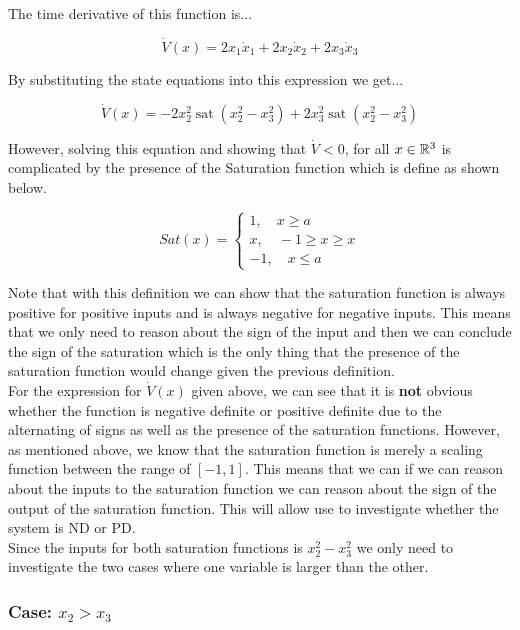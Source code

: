 \noindent The time derivative of this function is...

$$
\dot{V}(x) = 2x_1\dot{x}_1 + 2x_2\dot{x}_2 + 2x_3\dot{x}_3
$$


\noindent By substituting the state equations into this expression we get...

$$
\dot{V}(x)=-2 x_{2}^{2} \operatorname{sat}\left(x_{2}^{2}-x_{3}^{2}\right)+2 x_{3}^{2} \operatorname{sat}\left(x_{2}^{2}-x_{3}^{2}\right)
$$

However, solving this equation and showing that $\dot{V} < 0$, for all $x \in \mathbb{R}^3$ is complicated by the presence of the Saturation function which is define as shown below.

$$
Sat(x) = \begin{cases}
1, \quad x \geq a \\
x, \quad -1\geq x \geq x\\
-1, \quad x\leq a
\end{cases}
$$


\noindent Note that with this definition we can show that the saturation function is always positive for positive inputs and is always negative for negative inputs. This means that we only need to reason about the sign of the input and then we can conclude the sign of the saturation which is the only thing that the presence of the saturation function would change given the previous definition. \\


\noindent For the expression for $\dot{V}(x)$ given above, we can see that it is \textbf{not} obvious whether the function is negative definite or positive definite due to the alternating of signs as well as the presence of the saturation functions. However, as mentioned above, we know that the saturation function is merely a scaling function between the range of $[-1,1]$. This means that we can if we can reason about the inputs to the saturation function we can reason about the sign of the output of the saturation function. This will allow use to investigate whether the system is ND or PD. \\

\noindent Since the inputs for both saturation functions is $x_2^2 - x_3^2$ we only need to investigate the two cases where one variable is larger than the other.


\subsubsection*{Case: $x_2 > x_3$}

